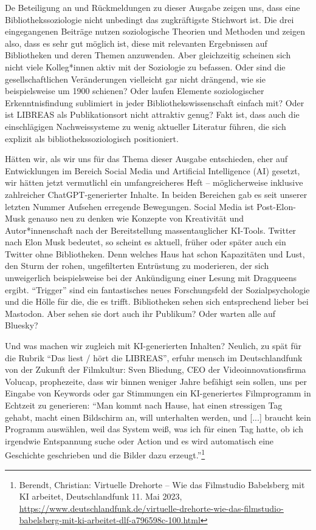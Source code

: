 \documentclass[a4paper,
fontsize=11pt,
oneside,
numbers=noperiodatend,
parskip=half-,
bibliography=totoc,
final
]{scrartcl}
\begin{document}
De Beteiligung an und Rückmeldungen zu dieser Ausgabe zeigen uns, dass
eine Bibliothekssoziologie nicht unbedingt das zugkräftigste Stichwort
ist. Die drei eingegangenen Beiträge nutzen soziologische Theorien und
Methoden und zeigen also, dass es sehr gut möglich ist, diese mit
relevanten Ergebnissen auf Bibliotheken und deren Themen anzuwenden.
Aber gleichzeitig scheinen sich nicht viele Kolleg*innen aktiv mit der
Soziologie zu befassen. Oder sind die gesellschaftlichen Veränderungen
vielleicht gar nicht drängend, wie sie beispielsweise um 1900 schienen?
Oder laufen Elemente soziologischer Erkenntnisfindung sublimiert in
jeder Bibliothekswissenschaft einfach mit? Oder ist LIBREAS als
Publikationsort nicht attraktiv genug? Fakt ist, dass auch die
einschlägigen Nachweissysteme zu wenig aktueller Literatur führen, die
sich explizit als bibliothekssoziologisch positioniert.

Hätten wir, als wir uns für das Thema dieser Ausgabe entschieden, eher
auf Entwicklungen im Bereich Social Media und Artificial Intelligence
(AI) gesetzt, wir hätten jetzt vermutlichl ein umfangreicheres Heft --
möglicherweise inklusive zahlreicher ChatGPT-generierter Inhalte. In
beiden Bereichen gab es seit unserer letzten Nummer Aufsehen erregende
Bewegungen. Social Media ist Post-Elon-Musk genauso neu zu denken wie
Konzepte von Kreativität und Autor*innenschaft nach der Bereitstellung
massentauglicher KI-Tools. Twitter nach Elon Musk bedeutet, so scheint
es aktuell, früher oder später auch ein Twitter ohne Bibliotheken. Denn
welches Haus hat schon Kapazitäten und Lust, den Sturm der rohen,
ungefilterten Entrüstung zu moderieren, der sich unweigerlich
beispielsweise bei der Ankündigung einer Lesung mit Dragqueens ergibt.
\enquote{Trigger} sind ein fantastisches neues Forschungsfeld der
Sozialpsychologie und die Hölle für die, die es trifft. Bibliotheken
sehen sich entsprechend lieber bei Mastodon. Aber sehen sie dort auch
ihr Publikum? Oder warten alle auf Bluesky?

Und was machen wir zugleich mit KI-generierten Inhalten? Neulich, zu
spät für die Rubrik \enquote{Das liest / hört die LIBREAS}, erfuhr
mensch im Deutschlandfunk von der Zukunft der Filmkultur: Sven Bliedung,
CEO der Videoinnovationsfirma Volucap, prophezeite, dass wir binnen
weniger Jahre befähigt sein sollen, uns per Eingabe von Keywords oder
gar Stimmungen ein KI-generiertes Filmprogramm in Echtzeit zu
generieren: \enquote{Man kommt nach Hause, hat einen stressigen Tag
gehabt, macht einen Bildschirm an, will unterhalten werden, und
{[}...{]} braucht kein Programm auswählen, weil das System weiß, was ich
für einen Tag hatte, ob ich irgendwie Entspannung suche oder Action und
es wird automatisch eine Geschichte geschrieben und die Bilder dazu
erzeugt.}\footnote{Berendt, Christian: Virtuelle Drehorte -- Wie das
  Filmstudio Babelsberg mit KI arbeitet, Deutschlandfunk 11. Mai 2023,
  \href{https://www.deutschlandfunk.de/virtuelle-drehorte-wie-das-filmstudio-babelsberg-mit-ki-arbeitet-dlf-a796598c-100.html}{\underline{https://www.deutschlandfunk.de/virtuelle-drehorte-wie-das-filmstudio-babelsberg-mit-ki-arbeitet-dlf-a796598c-100.html}}}
\end{document}
